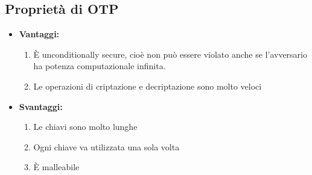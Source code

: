 \documentclass[a4paper,12pt]{article}
\begin{document}
\subsection{Proprietà di OTP}
\begin{itemize}
	\item \textbf{Vantaggi:}
	\begin{enumerate}
		\item È unconditionally secure, cioè non può essere violato anche se l'avversario ha potenza computazionale infinita.
		\item Le operazioni di criptazione e decriptazione sono molto veloci
	\end{enumerate}
	\item \textbf{Svantaggi:}
	\begin{enumerate}
		\item Le chiavi sono molto lunghe
		\item Ogni chiave va utilizzata una sola volta
		\item È malleabile
	\end{enumerate}
\end{itemize}
\end{document}
